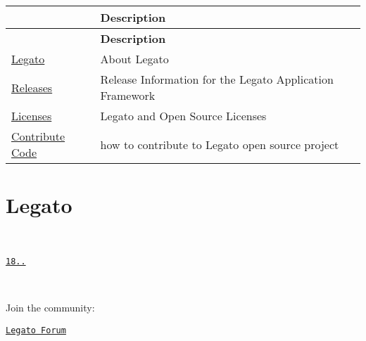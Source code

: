 \tabulinesep=1mm
\begin{longtabu} spread 0pt [c]{*2{|X[-1]}|}
\hline
{}&{\bf Description  }\\
\endfirsthead
\hline
\endfoot
\hline
{}&{\bf Description  }\\
\endhead
\hyperlink{aboutLegato}{Legato} &About Legato \\
\hyperlink{aboutReleaseInfo}{Releases} &Release Information for the Legato Application Framework \\
\hyperlink{aboutLicenses}{Licenses} &Legato and Open Source Licenses \\
\hyperlink{aboutLegatoContributing}{Contribute Code} &how to contribute to Legato open source project \\
\end{longtabu}
\hypertarget{aboutLegato}{}\section{Legato}\label{aboutLegato}
~\newline
 ~\newline
 ~\newline
 ~\newline


\begin{center}\end{center} 

\begin{center}\href{#}{\tt 18..}\end{center} 

\begin{center}~\newline
 ~\newline
\end{center} 

\begin{center}Join the community\+:\end{center} 

\begin{center}\href{https://forum.legato.io/}{\tt Legato Forum}\end{center} 

\begin{center}~\newline
 ~\newline
\end{center} 

